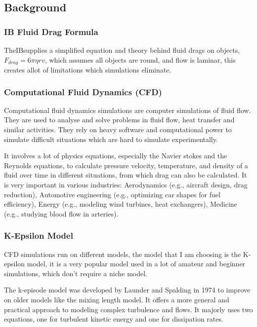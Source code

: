 \documentclass[12pt,a4paper]{article}
\begin{document}
\subsection{Background}

\subsubsection{IB Fluid Drag Formula}

TheIBsupplies a simplified equation and theory behind fluid drags on objects, $F_{drag} = 6\pi\eta rv$, which assumes all objects are round, and flow is laminar, this creates allot of limitations which simulations eliminate.

\subsubsection{Computational Fluid Dynamics (CFD)}

Computational fluid dynamics simulations are computer simulations of fluid flow. They are used to analyse and solve problems in fluid flow, heat transfer and similar activities. They rely on heavy software and computational power to simulate difficult situations which are hard to simulate experimentally. 

It involves a lot of physics equations, especially the Navier stokes and the Reynolds equations, to calculate pressure velocity, temperature, and density of a fluid over time in different situations, from which drag can also be calculated. It is very important in various industries: Aerodynamics (e.g., aircraft design, drag reduction), Automotive engineering (e.g., optimizing car shapes for fuel efficiency), Energy (e.g., modeling wind turbines, heat exchangers), Medicine (e.g., studying blood flow in arteries).

\subsubsection{K-Epsilon Model}

CFD simulations run on different models, the model that I am choosing is the K-epsilon model, it is a very popular model used in a lot of amateur and beginner simulations, which don't require a niche model.

The k-episode model was developed by Launder and Spalding in 1974 to improve on older models like the mixing length model. It offers a more general and practical approach to modeling complex turbulence and flows. It majorly uses two equations, one for turbulent kinetic energy and one for dissipation rates.
\end{document}
